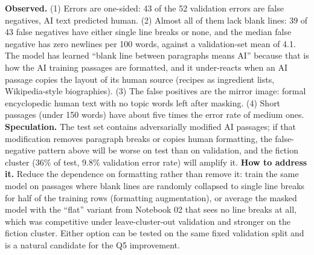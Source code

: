 \textbf{Observed.} (1) Errors are one-sided: 43 of the 52 validation errors are false negatives, AI text predicted human. (2) Almost all of them lack blank lines: 39 of 43 false negatives have either single line breaks or none, and the median false negative has zero newlines per 100 words, against a validation-set mean of 4.1. The model has learned ``blank line between paragraphs means AI'' because that is how the AI training passages are formatted, and it under-reacts when an AI passage copies the layout of its human source (recipes as ingredient lists, Wikipedia-style biographies). (3) The false positives are the mirror image: formal encyclopedic human text with no topic words left after masking. (4) Short passages (under 150 words) have about five times the error rate of medium ones.
\textbf{Speculation.} The test set contains adversarially modified AI passages; if that modification removes paragraph breaks or copies human formatting, the false-negative pattern above will be worse on test than on validation, and the fiction cluster (36\% of test, 9.8\% validation error rate) will amplify it.
\textbf{How to address it.} Reduce the dependence on formatting rather than remove it: train the same model on passages where blank lines are randomly collapsed to single line breaks for half of the training rows (formatting augmentation), or average the masked model with the ``flat'' variant from Notebook 02 that sees no line breaks at all, which was competitive under leave-cluster-out validation and stronger on the fiction cluster. Either option can be tested on the same fixed validation split and is a natural candidate for the Q5 improvement.
